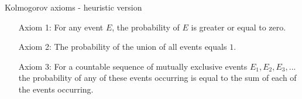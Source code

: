 \documentclass[a4,11pt]{beamer}
\newlength{\wideitemsep}
\let\olditem\item
\renewcommand{\item}{\setlength{\itemsep}{\wideitemsep}\olditem}
\begin{document}
\begin{frame}[allowframebreaks]{Kolmogorov axioms - heuristic version}
    \hspace*{1cm}\begin{minipage}{.9\linewidth}
     \begin{itemize}
        \item[Axiom 1:] For any event $E$, the probability of $E$ is greater or equal to zero.
        \item[Axiom 2:] The probability of the union of all events equals $1$.
        \item[Axiom 3:] For a countable sequence of mutually exclusive events $E_1,E_2,E_3,...$ the probability of any of these events occurring is equal to the sum of each of the events occurring.
    \end{itemize}   
    \end{minipage}
    
\end{frame}
\end{document}
